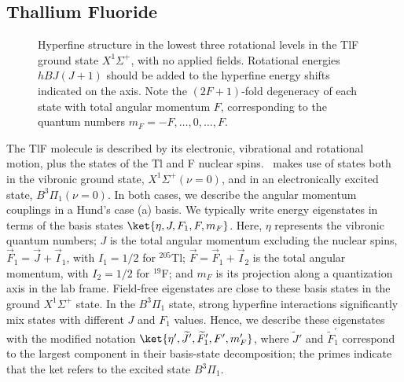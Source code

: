 \subsection{Thallium Fluoride}
\label{sec:tlf_theory}

\begin{figure}
	
	\caption{Hyperfine structure in the lowest three rotational levels in the TlF ground state $X^1\Sigma^+$, with no applied fields. Rotational energies $hBJ(J+1)$ should be added to
	the hyperfine energy shifts indicated on the axis. Note the $(2F+1)$-fold degeneracy of each state with total angular momentum $F$, corresponding to the quantum numbers $m_F=-F,\dots,0,\dots,F$.}
	\label{fig:level_diagram}

\end{figure}

The TlF molecule is described by its electronic, vibrational and rotational motion, plus the states of the Tl and F nuclear spins. \CENTREX\ makes use of states both in the vibronic ground state, $X ^1\Sigma^+\left(\nu=0\right)$, and in an electronically excited state, $B ^3\Pi_1\left(\nu=0\right)$.  In both cases, we describe the angular momentum couplings in a Hund's case (a) basis. We typically write energy eigenstates in terms of the basis states $\ket{\eta,J,F_1,F,m_F}$. Here, $\eta$ represents the vibronic quantum numbers; $J$ is the total angular momentum excluding the nuclear spins, $\vec{F}_1 = \vec{J}+\vec{I}_\mathrm{1}$, with $I_\mathrm{1}=1/2$ for $^{205}$Tl; $\vec{F} = \vec{F}_1+\vec{I}_\mathrm{2}$ is the total angular momentum, with $I_\mathrm{2}=1/2$ for $^{19}$F; and $m_F$ is its projection along a quantization axis in the lab frame. Field-free eigenstates are close to these basis states in the ground $X ^1\Sigma^+$ state.  In the $B ^3\Pi_1$ state, strong hyperfine interactions significantly mix states with different $J$ and $F_1$ values. Hence, we describe these eigenstates with the modified notation $\ket{\eta',\widetilde{J}' ,\widetilde{F}_1^\prime,F',m_F'}$, where $\widetilde{J}'$ and $\widetilde{F}_1^\prime$ correspond to the largest component in their basis-state decomposition; the primes indicate that the ket refers to the excited state $B ^3\Pi_1$.

